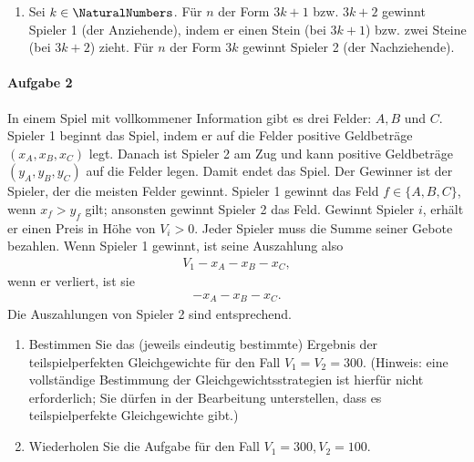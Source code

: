\begin{enumerate}
  \item Sei $k \in \NaturalNumbers$.
    Für $n$ der Form $3k+1$ bzw. $3k+2$ gewinnt Spieler 1 (der Anziehende),
    indem er einen Stein (bei $3k+1$) bzw. zwei Steine (bei $3k+2$) zieht.
    Für $n$ der Form $3k$ gewinnt Spieler 2 (der Nachziehende).
\end{enumerate}

\paragraph{Aufgabe 2}%
\label{par:serie_8_aufgabe_2}

In einem Spiel mit vollkommener Information gibt es drei Felder: $A, B$ und $C$.
Spieler 1 beginnt das Spiel, indem er auf die Felder positive Geldbeträge
$(x_A, x_B, x_C)$ legt.
Danach ist Spieler 2 am Zug und kann positive Geldbeträge $(y_A, y_B, y_C)$ auf die Felder
legen.
Damit endet das Spiel.
Der Gewinner ist der Spieler, der die meisten Felder gewinnt.
Spieler 1 gewinnt das Feld $f \in \{A,B,C\}$, wenn $x_f > y_f$ gilt;
ansonsten gewinnt Spieler 2 das Feld.
Gewinnt Spieler $i$, erhält er einen Preis in Höhe von $V_i > 0$.
Jeder Spieler muss die Summe seiner Gebote bezahlen.
Wenn Spieler 1 gewinnt, ist seine Auszahlung also
\begin{align*}
  V_1 - x_A - x_B - x_C,
\end{align*}
wenn er verliert, ist sie
\begin{align*}
  - x_A - x_B - x_C.
\end{align*}
Die Auszahlungen von Spieler 2 sind entsprechend.

\begin{enumerate}
  \item Bestimmen Sie das (jeweils eindeutig bestimmte) Ergebnis der teilspielperfekten
    Gleichgewichte für den Fall $V_1 = V_2 = 300$.
    (Hinweis: eine vollständige Bestimmung der Gleichgewichtsstrategien ist hierfür nicht
    erforderlich; Sie dürfen in der Bearbeitung unterstellen, dass es teilspielperfekte
    Gleichgewichte gibt.)
  \item Wiederholen Sie die Aufgabe für den Fall $V_1 = 300, V_2 = 100$.
\end{enumerate}

